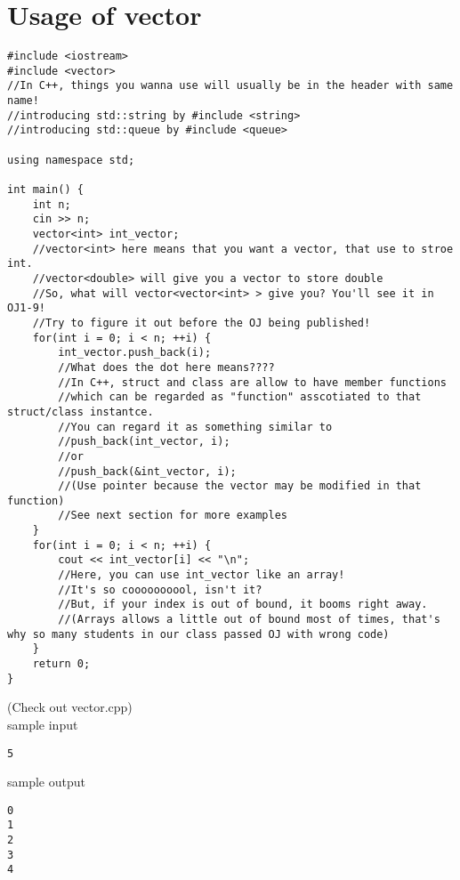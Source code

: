 \documentclass{article}
\begin{document}
\section{Usage of vector}
\begin{lstlisting}
#include <iostream>
#include <vector>
//In C++, things you wanna use will usually be in the header with same name!
//introducing std::string by #include <string>
//introducing std::queue by #include <queue>

using namespace std;

int main() {
    int n;
    cin >> n;
    vector<int> int_vector;
    //vector<int> here means that you want a vector, that use to stroe int.
    //vector<double> will give you a vector to store double
    //So, what will vector<vector<int> > give you? You'll see it in OJ1-9!
    //Try to figure it out before the OJ being published!
    for(int i = 0; i < n; ++i) {
        int_vector.push_back(i);
        //What does the dot here means????
        //In C++, struct and class are allow to have member functions
        //which can be regarded as "function" asscotiated to that struct/class instantce.
        //You can regard it as something similar to
        //push_back(int_vector, i);
        //or
        //push_back(&int_vector, i);
        //(Use pointer because the vector may be modified in that function)
        //See next section for more examples
    }
    for(int i = 0; i < n; ++i) {
        cout << int_vector[i] << "\n";
        //Here, you can use int_vector like an array!
        //It's so coooooooool, isn't it?
        //But, if your index is out of bound, it booms right away.
        //(Arrays allows a little out of bound most of times, that's why so many students in our class passed OJ with wrong code)
    }
    return 0;
}

\end{lstlisting}
(Check out vector.cpp)\\
sample input
\begin{lstlisting}
5
\end{lstlisting}
sample output
\begin{lstlisting}
0
1
2
3
4
\end{lstlisting}
\end{document}

